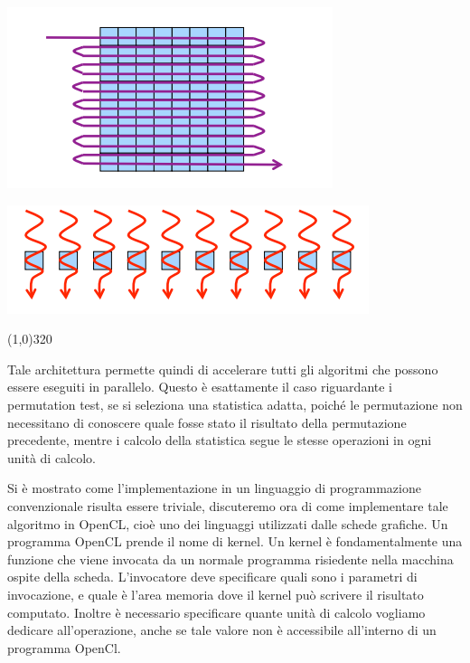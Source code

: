 \begin{center}
\includegraphics[scale=0.5]{sequential}
\end{center}
\begin{center}

	\includegraphics[scale=0.5]{parallel}
\end{center}

\line(1,0){320}

Tale architettura permette quindi di accelerare tutti gli algoritmi che possono essere eseguiti in parallelo. Questo è esattamente il caso riguardante i permutation test, se si seleziona una statistica adatta, poiché le permutazione non necessitano di conoscere quale fosse stato il risultato della permutazione precedente, mentre i calcolo della statistica segue le stesse operazioni in ogni unità di calcolo.

Si è mostrato come l'implementazione in un linguaggio di programmazione convenzionale risulta essere triviale, discuteremo ora di come implementare tale algoritmo in OpenCL, cioè uno dei linguaggi utilizzati dalle schede grafiche. Un programma OpenCL prende il nome di kernel. Un kernel è fondamentalmente una funzione che viene invocata da un normale programma risiedente nella macchina ospite della scheda. L'invocatore deve specificare quali sono i parametri di invocazione, e quale è l'area memoria dove il kernel può scrivere il risultato computato. 
Inoltre è necessario specificare quante unità di calcolo vogliamo dedicare all'operazione, anche se tale valore non è accessibile all'interno di un programma OpenCl.

